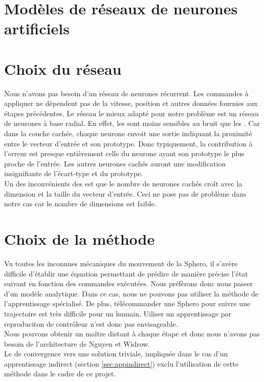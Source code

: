 \documentclass[12pt,a4paper,oneside, titlepage]{article}
\begin{document}


\tableofcontents
\newpage


\section{Modèles de réseaux de neurones artificiels}
\terminologie


%

%





\section{Choix du réseau}
Nous n'avons pas besoin d'un réseau de neurones récurrent.
Les commandes à appliquer ne dépendent pas de la vitesse, position et autres données fournies aux étapes précédentes.
Le réseau le mieux adapté pour notre problème est un réseau de neurones à base radial.
En effet, les \rbf sont moins sensibles au bruit que les \mlp \cite{adversarial,Gauthier}.%
Car dans la couche cachée, chaque neurone envoit une sortie indiquant la proximité entre le vecteur d'entrée et son prototype.
Donc typiquement, la contribution à l'erreur est presque entièrement celle du neurone ayant son prototype le plus proche de l'entrée.
Les autres neurones cachés auront une modification insignifiante de l'écart-type et du prototype.\\

Un des inconvénients des \rbf est que le nombre de neurones cachés croît avec la dimension et la taille du vecteur d'entrée.
Ceci ne pose pas de problème dans notre cas car le nombre de dimensions est faible.



\section{Choix de la méthode}
Vu toutes les inconnues mécaniques du mouvement de la Sphero, il s'avère difficile d'établir une équation permettant de prédire de manière précise l'état suivant en fonction des commandes exécutées.
Nous préfèrons donc nous passer d'un modèle analytique.
Dans ce cas, nous ne pouvons pas utiliser la méthode de l'apprentissage spécialisé.
De plus, télécommander une Sphero pour suivre une trajectoire est très difficile pour un humain.
Uiliser un apprentissage par reproduciton de contrôleur n'est donc pas envisageable.\\
Nous pouvons obtenir un maître distant à chaque étape et donc nous n'avons pas besoin de l'architecture de Nguyen et Widrow.\\
Le de convergence vers une solution triviale, impliquée dans le cas d'un apprentissage indirect (section \ref{sec:appindirect}) exclu l'utilisation de cette méthode dans le cadre de ce projet.\\
\end{document}
